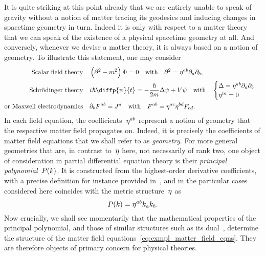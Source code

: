 It is quite striking at this point already that we are entirely unable to speak of gravity without a notion of matter tracing its geodesics and inducing changes in spacetime geometry in turn. Indeed it is only with respect to a matter theory that we can speak of the existence of a physical spacetime geometry at all. And conversely, whenever we devise a matter theory, it is always based on a notion of geometry. To illustrate this statement, one may consider
\begin{subequations}\label{eq:exmpl_matter_field_eqns}
\begin{align}
	\text{Scalar field theory} \quad &\left(\partial^2-\mass^2\right)\matterfields=0 \quad \text{with} \quad \partial^2=\mattergeom^{ab}\partial_a\partial_b\eqpunct{,}\label{eq:scal_dyn}\\
	\text{Schrödinger theory} \quad &\iu\hbar\diffp{\wavefunc}{t}=-\frac{\hbar}{2\mass}\Delta\wavefunc+\pot\wavefunc \quad \text{with} \quad \begin{cases}
		\Delta=\mattergeom^{ab}\partial_a\partial_b\\
		\mattergeom^{ta}=0
	\end{cases}\label{eq:schroed_dyn}\\
	\text{or Maxwell electrodynamics} \quad &\partial_b\fstr^{ab}=\emcurr^a \quad \text{with} \quad \fstr^{ab}=\mattergeom^{ac}\mattergeom^{bd}\fstr_{cd}\label{eq:mw_dyn}
	\eqpunct{.}
\end{align}
\end{subequations}
In each field equation, the coefficients~$\eta^{ab}$ represent a notion of geometry that the respective matter field propagates on. Indeed, it is precisely the coefficients of matter field equations that we shall refer to as \emph{geometry}. For more general geometries that are, in contrast to~$\eta$ here, not necessarily of rank two, one object of consideration in partial differential equation theory is their \emph{principal polynomial}~$P(k)$. It is constructed from the highest-order derivative coefficients, with a precise definition for instance provided in~\autocite{DispRel2011}, and in the particular cases considered here coincides with the metric structure~$\eta$ as
\begin{equation}
	P(k)=\eta^{ab}k_ak_b
	\mathpunct{.}
\end{equation}
Now crucially, we shall see momentarily that the mathematical properties of the principal polynomial, and those of similar structures such as its dual~\autocite{DispRel2011}, determine the structure of the matter field equations~\eqref{eq:exmpl_matter_field_eqns}. They are therefore objects of primary concern for physical theories.

